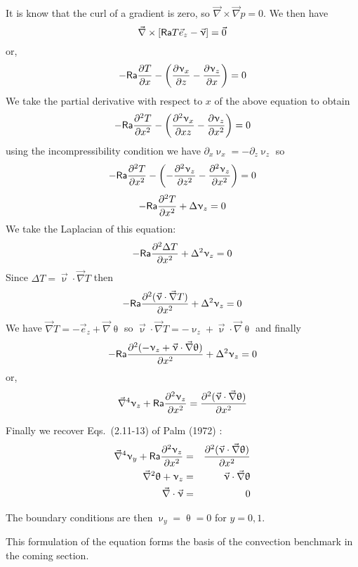 It is know that the curl of a gradient is zero, so $\vec\nabla \times \vec\nabla p =0$. 
We then have
\[
\vec\nabla \times [ {\mathsf{Ra}} T \vec{e}_z - \vec{\upnu}   ] = \vec{0}
\]
or, 
\[
-{\mathsf{Ra}} \frac{\partial T}{\partial x} - 
\left(\frac{\partial \upnu_x}{\partial z}-\frac{\partial \upnu_z}{\partial x}   \right) =0
\]
We take the partial derivative with respect to $x$ of the above 
equation to obtain
\[
-{\mathsf{Ra}} \frac{\partial^2 T}{\partial x^2} - 
\left(\frac{\partial^2 \upnu_x}{\partial xz}
-\frac{\partial \upnu_z}{\partial x^2}  \right) =0
\]
using the incompressibility condition we have $\partial_x \upnu_x = -\partial_z \upnu_z$ so 
\[
-{\mathsf{Ra}} \frac{\partial^2 T}{\partial x^2} - 
\left(-\frac{\partial^2 \upnu_z}{\partial z^2}
-\frac{\partial^2 \upnu_z}{\partial x^2}  \right) =0
\]
\[
-{\mathsf{Ra}} \frac{\partial^2 T}{\partial x^2} 
+ \Delta \upnu_z=0
\]
We take the Laplacian of this equation:
\[
-{\mathsf{Ra}} \frac{\partial^2 \Delta T}{\partial x^2} 
+ \Delta^2 \upnu_z=0
\]
Since $\Delta T= \vec\upnu\cdot\vec\nabla T$ then
\[
-{\mathsf{Ra}} \frac{\partial^2 (\vec\upnu\cdot\vec\nabla T)}{\partial x^2} 
+ \Delta^2 \upnu_z=0
\]
We have $\vec\nabla T = -\vec{e}_z + \vec\nabla \uptheta$
so $\vec\upnu\cdot\vec\nabla T = -\upnu_z + \vec\upnu \cdot \vec\nabla \uptheta $ and finally
\[
-{\mathsf{Ra}} \frac{\partial^2 (  -\upnu_z + \vec\upnu \cdot \vec\nabla \uptheta    )}{\partial x^2} + \Delta^2 \upnu_z=0
\]
or,
\[
\vec\nabla^4 \upnu_z + {\mathsf{Ra}} \frac{\partial^2 \upnu_z}{\partial x^2}
= \frac{\partial^2 (\vec\upnu \cdot \vec\nabla \uptheta)}{\partial x^2} 
\]



Finally we recover Eqs.~(2.11-13) of Palm \etal (1972) \cite{pawk72}:
\begin{eqnarray}
\vec\nabla^4 \upnu_y +{\mathsf{Ra}} \frac{\partial^2 \upnu_z}{\partial x^2}
&=& \frac{\partial^2 (\vec\upnu \cdot \vec\nabla \uptheta)}{\partial x^2}  \\
\vec\nabla^2 \uptheta + \upnu_z &=&  \vec\upnu \cdot\vec\nabla\uptheta \\
\vec\nabla\cdot \vec\upnu &=& 0
\end{eqnarray}


The boundary conditions are then $\upnu_y = \uptheta=0$ for $y=0,1$.

This formulation of the equation forms the basis 
of the convection benchmark in the coming section.

